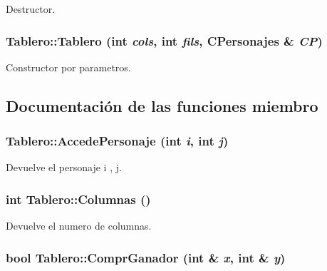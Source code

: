 Destructor. 

\hypertarget{class_tablero_034b3882eed22ce2d2da3787f86291af}{
\subsubsection[{Tablero}]{\setlength{\rightskip}{0pt plus 5cm}Tablero::Tablero (int {\em cols}, \/  int {\em fils}, \/  {\bf CPersonajes} \& {\em CP})}}
\label{class_tablero_034b3882eed22ce2d2da3787f86291af}


Constructor por parametros. 



\subsection{Documentación de las funciones miembro}
\hypertarget{class_tablero_ac371cb24f7f9622eeadaa89769ec727}{
\subsubsection[{AccedePersonaje}]{ Tablero::AccedePersonaje (int {\em i}, \/  int {\em j})}}
\label{class_tablero_ac371cb24f7f9622eeadaa89769ec727}


Devuelve el personaje i , j. 

\hypertarget{class_tablero_54df6b87ccaebbd19ce4447e25465076}{
\subsubsection[{Columnas}]{\setlength{\rightskip}{0pt plus 5cm}int Tablero::Columnas ()}}
\label{class_tablero_54df6b87ccaebbd19ce4447e25465076}


Devuelve el numero de columnas. 

\hypertarget{class_tablero_03cfb33860dba233ce0ee015910773fc}{
\subsubsection[{ComprGanador}]{\setlength{\rightskip}{0pt plus 5cm}bool Tablero::ComprGanador (int \& {\em x}, \/  int \& {\em y})}}
\label{class_tablero_03cfb33860dba233ce0ee015910773fc}


